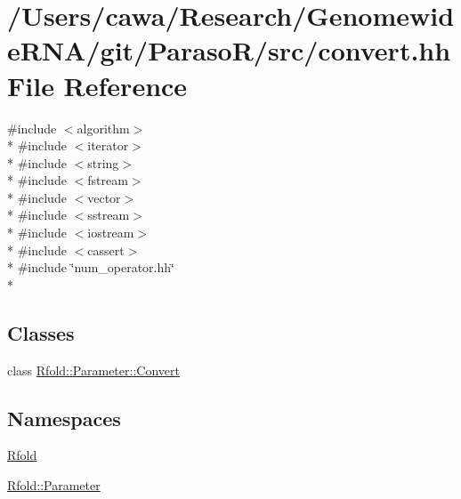 \hypertarget{convert_8hh}{\section{/\+Users/cawa/\+Research/\+Genomewide\+R\+N\+A/git/\+Paraso\+R/src/convert.hh File Reference}
\label{convert_8hh}
}
{\ttfamily \#include $<$algorithm$>$}\\*
{\ttfamily \#include $<$iterator$>$}\\*
{\ttfamily \#include $<$string$>$}\\*
{\ttfamily \#include $<$fstream$>$}\\*
{\ttfamily \#include $<$vector$>$}\\*
{\ttfamily \#include $<$sstream$>$}\\*
{\ttfamily \#include $<$iostream$>$}\\*
{\ttfamily \#include $<$cassert$>$}\\*
{\ttfamily \#include \char`\"{}num\+\_\+operator.\+hh\char`\"{}}\\*
\subsection*{Classes}
\begin{DoxyCompactItemize}
\item 
class \hyperlink{class_rfold_1_1_parameter_1_1_convert}{Rfold\+::\+Parameter\+::\+Convert}
\end{DoxyCompactItemize}
\subsection*{Namespaces}
\begin{DoxyCompactItemize}
\item 
 \hyperlink{namespace_rfold}{Rfold}
\item 
 \hyperlink{namespace_rfold_1_1_parameter}{Rfold\+::\+Parameter}
\end{DoxyCompactItemize}
